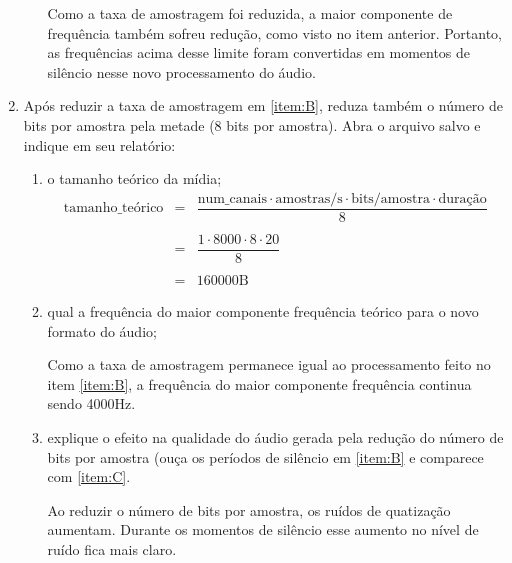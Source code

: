 \documentclass[12pt, a4paper, oneside]{abntex2}
\renewcommand{\theenumi}{\Alph*}
\begin{document}
\begin{enumerate}[ref=\theenumi]
\begin{enumerate}
                    Como a taxa de amostragem foi reduzida, a maior componente de frequência também sofreu redução, como visto no item anterior. Portanto, as frequências acima desse limite foram convertidas em momentos de silêncio nesse novo processamento do áudio.
            \end{enumerate}
        \item\label{item:C} Após reduzir a taxa de amostragem em \ref{item:B}, reduza também o número de bits por amostra pela metade (8 bits por amostra). Abra o arquivo salvo e indique em seu relatório:
            \begin{enumerate}
                \item o tamanho teórico da mídia;
                \[
                    \begin{matrix}
                        \text{tamanho\_teórico} & = & \dfrac{\text{num\_canais} \cdot \text{amostras/s} \cdot \text{bits/amostra} \cdot \text{duração}}{8} \\ \\
                        & = &   \dfrac{1 \cdot 8000 \cdot 8 \cdot 20}{8} \\ \\
                        & = &   160000\text{B}
                    \end{matrix}
                \]

                \item qual a frequência do maior componente frequência teórico para o novo formato do áudio;

                    Como a taxa de amostragem permanece igual ao processamento feito no item \ref{item:B}, a frequência do maior componente frequência continua sendo 4000Hz.

                \item explique o efeito na qualidade do áudio gerada pela redução do número de bits por
                    amostra (ouça os períodos de silêncio em \ref{item:B} e comparece com \ref{item:C}.

                    Ao reduzir o número de bits por amostra, os ruídos de quatização aumentam. Durante os momentos de silêncio esse aumento no nível de ruído fica mais claro.
            \end{enumerate}
    \end{enumerate}
\end{document}
